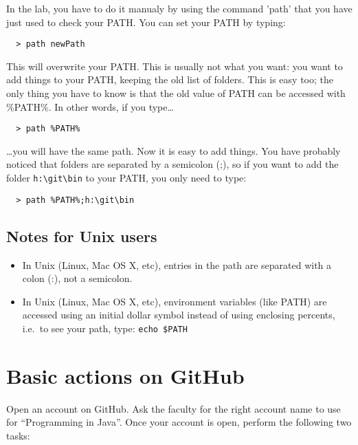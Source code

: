 \documentclass{article}
\begin{document}
In the lab, you have to do it manualy by using the command 'path' that
you have 
just used to check your PATH. You can set your PATH by typing:

\begin{verbatim}
  > path newPath
\end{verbatim}


This will overwrite your PATH. This is usually not what you want: you
want to add things to your PATH, keeping the old list of folders. This
is easy too; the only thing you have to know is that the old value of
PATH can be accessed with \%PATH\%. In other words, if you type\ldots

\begin{verbatim}
  > path %PATH%
\end{verbatim}

\ldots you will have the same path. Now it is easy to add things. You
have probably noticed that folders are separated by a semicolon (;),
so if you want to add the folder \verb+h:\git\bin+ to your PATH, you
only 
need to type:

\begin{verbatim}
  > path %PATH%;h:\git\bin
\end{verbatim}


\subsection*{Notes for Unix users}
\label{sec:notes-unix-users}

\begin{itemize}
\item In Unix (Linux, Mac OS X, etc), entries in the path are
  separated with a colon (:), not a semicolon.
\item In Unix (Linux, Mac OS X, etc), environment variables (like
  PATH) are accessed using an initial dollar symbol instead of using
  enclosing percents, i.e.~to see your path, type: \verb+echo $PATH+
\end{itemize}

\section{Basic actions on GitHub}
\label{sec:basic-steps-with}

Open an account on GitHub. Ask the faculty for the right account name
to use for ``Programming in Java''. Once your account is open, perform
the following two tasks: 
\end{document}
